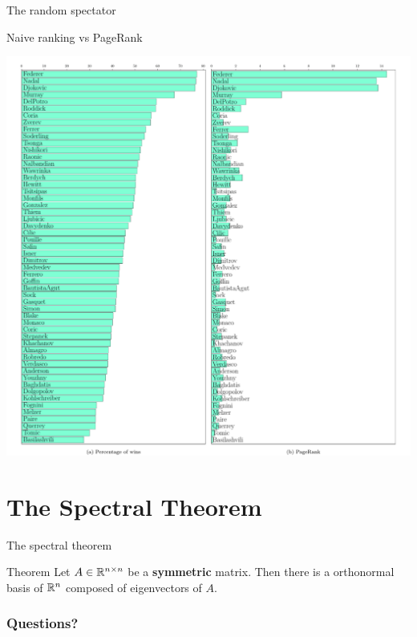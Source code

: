 \documentclass{beamer}
\begin{document}
\begin{frame}[t]{The random spectator}
	\grid

\end{frame}

\begin{frame}[t]{Naive ranking vs PageRank}
	\grid

	\vspace{-1.0cm}
	\begin{center}
		\hspace*{-1.3cm}
		\includegraphics[width=13.5cm]{../pagerank_tennis.pdf}
	\end{center}
\end{frame}

\section{The Spectral Theorem}

\begin{frame}[t]{The spectral theorem}
	\grid
	
	\vspace{-0.3cm}
	\begin{block}{Theorem}
	Let $A \in \mathbb{R}^{n \times n}$ be a \textbf{symmetric} matrix. Then there is a orthonormal basis of $\mathbb{R}^n$ composed of eigenvectors of $A$.
	\end{block}
\end{frame}



\appendix
\backupbegin
\begin{frame}[t]
	\frametitle{Questions?}
	\grid

	\pause
\end{frame}
\backupend
\end{document}
